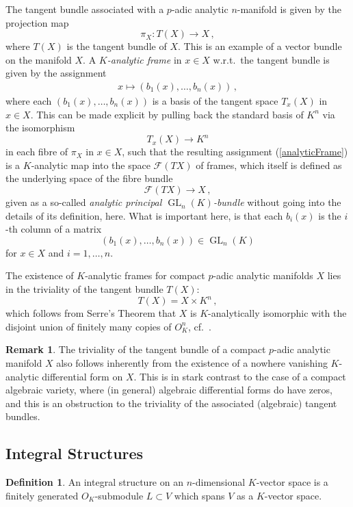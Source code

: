 \documentclass[a4paper,draft]{ZbRad}
\theoremstyle{plain}
\theoremstyle{definition}
\newtheorem{rem}{Remark}[section]
\newtheorem{dfn}{Definition}[section]
\numberwithin{equation}{section}
\DeclareMathOperator{\GL}{GL}
\begin{document}
The tangent bundle associated with a $p$-adic analytic $n$-manifold is given by the projection map
\[
\pi_X\colon T(X)\to X\,,
\]
where $T(X)$ is the tangent bundle of $X$. This is an example of a vector bundle on the manifold $X$. A  \emph{$K$-analytic frame} in $x\in X$ w.r.t.\ the tangent bundle is given by the assignment
\begin{align}\label{analyticFrame}
x\mapsto (b_1(x),\dots,b_n(x))\,,
\end{align}
where each $(b_1(x),\dots,b_n(x))$ is a basis of the tangent space $T_x(X)$ in $x\in X$. This can be made explicit by pulling back the standard basis of $K^n$ via the isomorphism
\[
T_x(X)\to K^n
\]
in each fibre of $\pi_X$ in $x\in X$, such that the resulting assignment (\ref{analyticFrame}) is a $K$-analytic map into the space $\mathcal{F}(TX)$ of frames, which itself is defined as the underlying space of the fibre bundle
\[
\mathcal{F}(TX)\to X\,,
\]
given as a so-called \emph{analytic principal $\GL_n(K)$-bundle} without going into the details of its definition, here. What is important here, is that each $b_i(x)$ is the $i$-th column of a matrix
\[
(b_1(x),\dots,b_n(x))\in\GL_n(K)
\]
for $x\in X$ and $i=1,\dots,n$.
\newline

The existence of $K$-analytic frames for compact $p$-adic analytic manifolds $X$ lies in the triviality of the tangent bundle $T(X)$:
\[
T(X)=X\times K^n\,,
\]
which follows from Serre's Theorem that $X$ is $K$-analytically isomorphic with the disjoint union of finitely many copies of $O_K^n$, cf.\ \cite[Th\'eor\`eme (1)]{Serre1965}. 

\begin{rem}
The triviality of the tangent bundle of a compact $p$-adic analytic manifold $X$ also follows inherently from the existence of a nowhere vanishing $K$-analytic differential form on $X$. This is in stark contrast to the case of a compact algebraic variety, where (in general) algebraic differential forms do have zeros, and this is an obstruction to the triviality of the associated (algebraic) tangent bundles.
\end{rem}



\subsection{Integral Structures}


\begin{dfn}
An integral structure on an $n$-dimensional $K$-vector space
is a finitely generated $O_K$-submodule 
$L\subset V$ which spans $V$ as a $K$-vector space.
\end{dfn}
\end{document}
